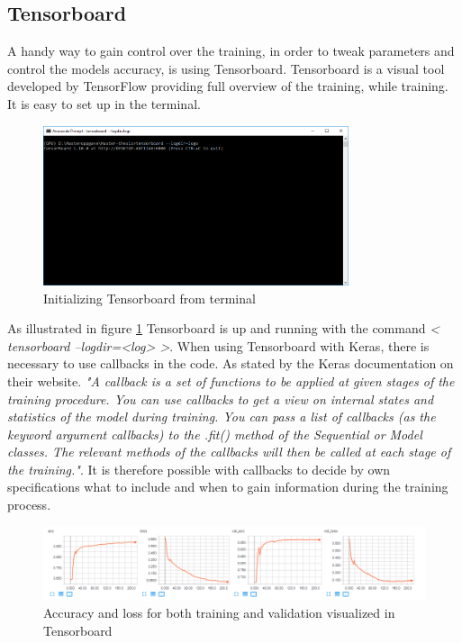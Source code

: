 \documentclass[USenglish]{ifimaster}  %
\begin{document}
\subsection{Tensorboard}
A handy way to gain control over the training, in order to tweak parameters and control the models accuracy, is using Tensorboard. Tensorboard is a visual tool developed by TensorFlow providing full overview of the training, while training. It is easy to set up in the terminal.
\begin{figure}[ht]
    \centering
    \includegraphics[width=0.8\textwidth]{bilder/tensorboard_anaconda_prompt.PNG}
    \caption{Initializing Tensorboard from terminal}
    \label{fig:tensorboard_anaconda_prompt}
\end{figure}
\newline
As illustrated in figure \ref{fig:tensorboard_anaconda_prompt} Tensorboard is up and running with the command \textit{< tensorboard --logdir=<log> >}. 
\newline
When using Tensorboard with Keras, there is necessary to use callbacks in the code. As stated by the Keras documentation on their website.
\newline
\newline
\textit{"A callback is a set of functions to be applied at given stages of the training procedure. You can use callbacks to get a view on internal states and statistics of the model during training. You can pass a list of callbacks (as the keyword argument callbacks) to the .fit() method of the Sequential or Model classes. The relevant methods of the callbacks will then be called at each stage of the training."}\cite{website:Keras_doc}. 
\newline
\newline
It is therefore possible with callbacks to decide by own specifications what to include and when to gain information during the training process.  
\begin{figure}[ht]
    \centering
    \includegraphics[width=1\textwidth]{bilder/tensorboard_acc_loss.PNG}
    \caption{Accuracy and loss for both training and validation visualized in Tensorboard}
    \label{fig:accuracy_loss}
\end{figure}
\end{document}
